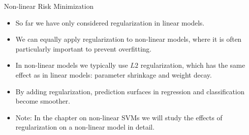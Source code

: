 \begin{vbframe}{Non-linear Risk Minimization}

\begin{itemize}
  \item So far we have only considered regularization in linear models.
  \item We can equally apply regularization to non-linear models, where it is 
  often particularly important to prevent overfitting.
  \item In non-linear models we typically use $L2$ regularization, which has the 
  same effect as in linear models: parameter shrinkage and weight decay.
  \item By adding regularization, prediction surfaces in regression and 
  classification become smoother. 
  \item Note: In the chapter on non-linear SVMs we will study the effects of
  regularization on a non-linear model in detail. 
\end{itemize}

\end{vbframe}


